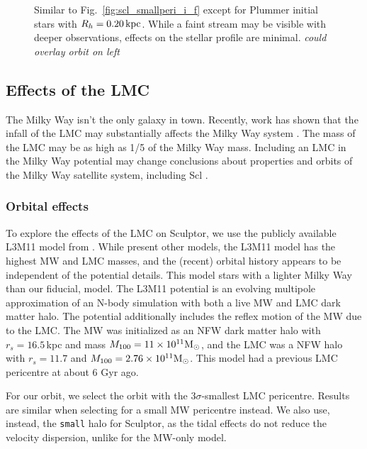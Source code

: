 \begin{figure}
\centering
{}
\caption[Sculptor Plummer initial and final density profiles]{Similar to
Fig.~\ref{fig:scl_smallperi_i_f} except for Plummer initial stars with
\(R_h = 0.20\,{\rm kpc}\). While a faint stream may be visible with deeper
observations, effects on the stellar profile are minimal. \emph{could
overlay orbit on left}}\label{fig:scl_smallperi_plummer_i_f}
\end{figure}

\subsection{Effects of the LMC}\label{sec:scl_lmc}

The Milky Way isn't the only galaxy in town. Recently, work has shown
that the infall of the LMC may substantially affects the Milky Way
system
\citep[e.g.,][]{erkal+2019, cautun+2019, garavito-camargo+2021, vasiliev2023}.
The mass of the LMC may be as high as 1/5 of the Milky Way mass.
Including an LMC in the Milky Way potential may change conclusions about
properties and orbits of the Milky Way satellite system, including Scl
\citep[e.g.,][]{patel+2020, battaglia+2022}.

\subsubsection{Orbital effects}\label{orbital-effects}

To explore the effects of the LMC on Sculptor, we use the publicly
available L3M11 model from \citet{vasiliev2024}. While
\citet{vasiliev2024} present other models, the L3M11 model has the
highest MW and LMC masses, and the (recent) orbital history appears to
be independent of the potential details. This model stars with a lighter
Milky Way than our fiducial, \citet{mcmillan2011-like} model. The L3M11
potential is an evolving multipole approximation of an N-body simulation
with both a live MW and LMC dark matter halo. The potential additionally
includes the reflex motion of the MW due to the LMC. The MW was
initialized as an NFW dark matter halo with \(r_s=16.5\,\)kpc and mass
\(M_{\rm 100}= 11\times10^{11}{\rm M}_{\odot}\), and the LMC was a NFW halo with
\(r_s=11.7\) and \(M_{100} = 2.76 \times 10^{11} {\rm M}_{\odot}\). This model had a
previous LMC pericentre at about 6 Gyr ago.

For our orbit, we select the orbit with the \(3\sigma\)-smallest LMC
pericentre. Results are similar when selecting for a small MW pericentre
instead. We also use, instead, the \texttt{small} halo for Sculptor, as
the tidal effects do not reduce the velocity dispersion, unlike for the
MW-only model.

